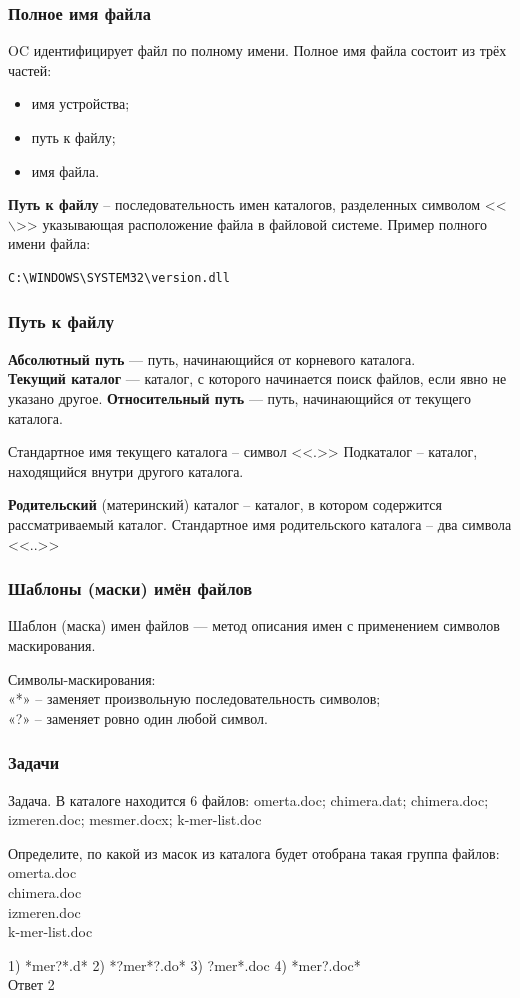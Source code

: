 \begin{frame}[fragile]
\frametitle{Полное имя файла}
OC идентифицирует файл по полному имени.
Полное имя файла состоит из трёх частей:
\begin{itemize}
	\item имя устройства;
	\item путь к файлу;
	\item имя файла.
\end{itemize}

\textbf{Путь к файлу} – последовательность имен каталогов, разделенных символом <<$\backslash$>> указывающая расположение файла в файловой системе.
Пример полного имени файла:
\begin{verbatim}
C:\WINDOWS\SYSTEM32\version.dll
\end{verbatim}

\end{frame}

\begin{frame}[fragile]
\frametitle{Путь к файлу}
\textbf{Абсолютный путь} --- путь, начинающийся от корневого каталога. \\
\textbf{Текущий каталог} --- каталог, с которого начинается поиск файлов, если явно не указано другое.
\textbf{Относительный путь} --- путь, начинающийся от текущего каталога.

Стандартное имя текущего каталога – символ <<.>>
Подкаталог – каталог, находящийся внутри другого каталога. 

\textbf{Родительский} (материнский) каталог – каталог, в котором содержится рассматриваемый каталог.
Стандартное имя родительского каталога – два символа  <<..>>

\end{frame}

\begin{frame}[fragile]
\frametitle{Шаблоны (маски) имён файлов}
Шаблон (маска) имен файлов --- метод описания имен с применением символов маскирования.

Символы-маскирования:\\
«*» – заменяет произвольную последовательность символов;\\
«?» – заменяет ровно один любой символ.

\end{frame}

\begin{frame}[fragile]
\frametitle{Задачи}
Задача. В каталоге находится 6 файлов:
omerta.doc; chimera.dat; chimera.doc; izmeren.doc; mesmer.docx; k-mer-list.doc

Определите, по какой из масок из каталога будет
отобрана такая группа файлов:\\
omerta.doc\\
chimera.doc\\
izmeren.doc\\
k-mer-list.doc

1) *mer?*.d*	2) *?mer*?.do*	3) ?mer*.doc	4) *mer?.doc*\\
\pause Ответ 2

\end{frame}



